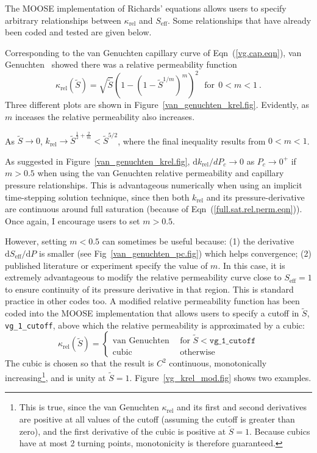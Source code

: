 \documentclass[]{scrreprt}
\begin{document}
The MOOSE implementation of Richards' equations allows users to
specify arbitrary relationships between $\kappa_{\mathrm{rel}}$ and
$S_{\mathrm{eff}}$.  Some relationships that have already been coded
and tested are given below.

Corresponding to the van Genuchten capillary curve of
Eqn~(\ref{vg.cap.eqn}), van Genuchten~\cite{vangenucthen1980} showed
there was a relative permeability function
\begin{equation}
\kappa_{\mathrm{rel}}(\tilde{S}) = \sqrt{\tilde{S}} \left( 1- \left(1 -
\tilde{S}^{1/m}\right)^{m} \right)^{2}
 \ \ \ \mbox{for}\ \ 0<m<1 \ .
\label{vg.krel.eqn}
\end{equation}
Three different plots are shown in
Figure~\ref{van_genuchten_krel.fig}.  Evidently, as $m$ inceases the
relative permeability also increases.

As $\tilde{S}\rightarrow 0$, $k_{\mathrm{rel}} \rightarrow \tilde{S}^{\frac{1}{2} +
  \frac{2}{m}} < \tilde{S}^{5/2}$, where the final inequality results from
$0<m<1$.

As suggested in Figure~\ref{van_genuchten_krel.fig},
$\mathrm{d}k_{\mathrm{rel}}/d P_{c} \rightarrow 0$ as
$P_{c}\rightarrow 0^{+}$ if $m>0.5$ when using the van Genuchten
relative permeability and capillary pressure relationships.  This is
advantageous numerically when using an implicit time-stepping solution
technique, since then both $k_{\mathrm{rel}}$ and its
pressure-derivative are continuous around full saturation (because of
Eqn~(\ref{full.sat.rel.perm.eqn})).  Once again, I encourage users to
set $m>0.5$.

However, setting $m<0.5$ can sometimes be useful because: (1) the
derivative $\mathrm{d}S_{\mathrm{eff}}/\mathrm{d} P$ is smaller (see
Fig~\ref{van_genuchten_pc.fig}) which helps convergence; (2) published
literature or experiment specify the value of $m$.  In this case, it
is extremely advantageous to modify the relative permeability curve
close to $S_{\mathrm{eff}}=1$ to ensure continuity of its pressure
derivative in that region.  This is standard practice in other codes
too.  A modified relative permeability function has been coded into
the MOOSE implementation that allows users to specify a cutoff in $\tilde{S}$, {\tt
  vg\_1\_cutoff}, above which the relative permeability is
approximated by a cubic:
\begin{equation}
\kappa_{\mathrm{rel}}(\tilde{S}) = \left\{
\begin{array}{ll}
\mbox{van Genuchten} & \ \ \mbox{for }
\tilde{S}<\mathtt{vg\_1\_cutoff} \\
\mbox{cubic} & \ \ \mbox{otherwise}
\end{array}
\right.
\label{eqn.mod_vg_1}
\end{equation}
The cubic is chosen so that the result is $C^{2}$ continuous,
monotonically increasing\footnote{This is true, since the van
  Genuchten $\kappa_{\mathrm{rel}}$ and its first and second
  derivatives are positive at all values of the cutoff (assuming the
  cutoff is greater than zero), and the first derivative of the cubic
  is positive at $\tilde{S}=1$.  Because cubics have at most 2 turning
  points, monotonicity is therefore guaranteed.}, and is unity at
$\tilde{S}=1$.  Figure~\ref{vg_krel_mod.fig} shows two examples.
\end{document}
